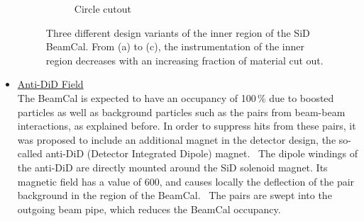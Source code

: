 \begin{itemize}
\begin{figure}
\begin{subfigure}[b]{0.3\textwidth}
   \caption{Circle cutout}
   \end{subfigure}
   \caption[Design variants of the SiD BeamCal]{Three different design variants of the inner region of the SiD BeamCal.
   From (a) to (c), the instrumentation of the inner region decreases with an increasing fraction of material cut out.}
   \label{fig:BeamCal}
 \end{figure}

 \item \underline{Anti-DiD Field}\\
 The BeamCal is expected to have an occupancy of 100\,\% due to boosted particles as well as background particles such as the \positron\electron pairs from beam-beam interactions, as explained before.
 In order to suppress hits from these \positron\electron pairs, it was proposed to include an additional magnet in the detector design, the so-called anti-DiD (Detector Integrated Dipole) magnet.~\cite{antiDiD}
 The dipole windings of the anti-DiD are directly mounted around the SiD solenoid magnet.
 Its magnetic field has a value of \SI{600}{\gauss}, and causes locally the deflection of the pair background in the region of the BeamCal.~\cite[p. 118]{TDR4}
 The pairs are swept into the outgoing beam pipe, which reduces the BeamCal occupancy.
\end{itemize}



\newpage
